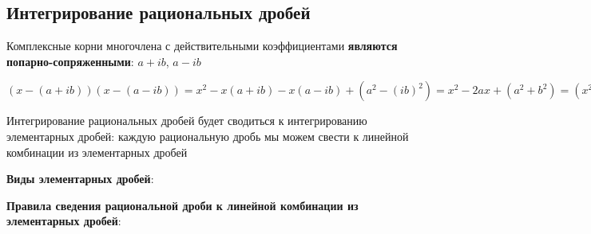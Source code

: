 \documentclass{article}
\begin{document}
\pagebreak
\subsection{Интегрирование рациональных дробей}

Комплексные корни многочлена с действительными коэффициентами \textbf{являются попарно-сопряженными}: $a + i b$, $a - i b$

$(x - (a + i b))(x - (a - i b)) = x^2 - x (a + i b) - x (a - i b) + (a^2 - (i b)^2) = x^2 - 2 a x + (a^2 + b^2) = (x^2 + p x + q)$

\hfill

Интегрирование рациональных дробей будет сводиться к интегрированию элементарных дробей: каждую рациональную дробь мы можем свести к линейной комбинации из элементарных дробей

\textbf{Виды элементарных дробей}:

\begin{multienumerate}
\end{multienumerate}

\textbf{Правила сведения рациональной дроби к линейной комбинации из элементарных дробей}:
\end{document}
